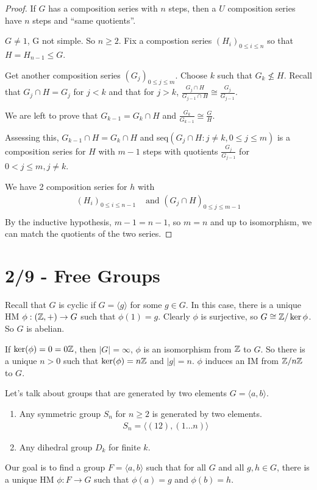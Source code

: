 \documentclass{report}
\begin{document}
\begin{proof}
    If $G$ has a composition series with $n$ steps, then a $U$ composition series have $n$ steps and ``same quotients''.

    $G \neq 1$, G not simple. So $n \geq 2$. Fix a compostion series $(H_i)_{0 \leq i \leq n}$ so that $H = H_{n-1} \leq G$. 

    Get another composition series $(G_j)_{0 \leq j \leq m}$. Choose $k$ such that $G_k \not\leq H$. Recall that $G_j \cap H = G_j$ for $j < k$ and that for $j>k$, $\frac{G_j \cap H}{G_{j-1} \cap H} \cong \frac{G_j}{G_{j-1}}$.

    We are left to prove that $G_{k-1} = G_k \cap H$ and $\frac{G_k}{G_{k-1}} \cong \frac{G}{H}$. 

    Assessing this, $G_{k-1} \cap H = G_k \cap H$ and seq$(G_j \cap H : j \neq k, 0 \leq j \leq m)$ is a composition series for $H$ with $m-1$ steps with quotients $\frac{G_j}{G_{j-1}}$ for $0 < j  \leq m, j \neq k$. 

    We have 2 composition series for $h$ with 
    \begin{align*}
        (H_i)_{0 \leq i \leq n-1} &\text{ and } (G_j \cap H)_{0 \leq j \leq m-1} \\
    \end{align*}
    By the inductive hypothesis, $m-1 = n-1$, so $m = n$ and up to isomorphism, we can match the quotients of the two series. 
\end{proof}

\section{2/9 - Free Groups}
Recall that $G$ is cyclic if $G = \langle g \rangle$ for some $g \in G$. In this case, there is a unique HM $\phi : (\ZZ, +) \to G$ such that $\phi(1) = g$. Clearly $\phi$ is surjective, so $G \cong \ZZ / \ker \phi$. So $G$ is abelian.

If $\ker(\phi) = 0 = 0 \ZZ$, then $|G| = \infty$, $\phi$ is an isomorphism from $\ZZ$ to $G$. So there is a unique $n > 0$ such that $\ker(\phi) = n \ZZ$ and $|g| = n$. $\phi$ induces an IM from $\ZZ / n \ZZ$ to $G$.

Let's talk about groups that are generated by two elements $G = \langle a, b \rangle$. 
\begin{enumerate}
    \item Any symmetric group $S_n$ for $n \geq 2$ is generated by two elements.
    \begin{align*}
        S_n = \langle (12), (1 \ldots n)\rangle
    \end{align*}
    \item Any dihedral group $D_k$ for finite $k$. 
\end{enumerate}
Our goal is to find a group $F = \langle a, b \rangle$ such that for all $G$ and all $g,h \in G$, there is a unique HM $\phi : F \to G$ such that $\phi(a) = g$ and $\phi(b) = h$. 
\end{document}
